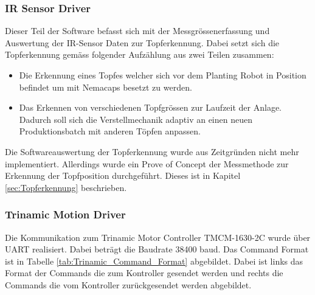 \subsubsection{IR Sensor Driver}
Dieser Teil der Software befasst sich mit der Messgrössenerfassung und Auswertung der IR-Sensor Daten zur Topferkennung. Dabei setzt sich die Topferkennung gemäss folgender Aufzählung aus zwei Teilen zusammen:

\begin{itemize}
	\item Die Erkennung eines Topfes welcher sich vor dem Planting Robot in Position befindet um mit Nemacaps besetzt zu werden.
	\item Das Erkennen von verschiedenen Topfgrössen zur Laufzeit der Anlage. Dadurch soll sich die Verstellmechanik adaptiv an einen neuen Produktionsbatch mit anderen Töpfen anpassen.
\end{itemize}

Die Softwareauswertung der Topferkennung wurde aus Zeitgründen nicht mehr implementiert. Allerdings wurde ein Prove of Concept der Messmethode zur Erkennung der Topfposition durchgeführt. Dieses ist in Kapitel \ref{sec:Topferkennung} beschrieben.

\subsubsection{Trinamic Motion Driver}
Die Kommunikation zum Trinamic Motor Controller TMCM-1630-2C wurde über UART realisiert. Dabei beträgt die Baudrate 38400 baud. Das Command Format ist in Tabelle \ref{tab:Trinamic_Command_Format} abgebildet. Dabei ist links das Format der Commands die zum Kontroller gesendet werden und rechts die Commands die vom Kontroller zurückgesendet werden abgebildet. 

